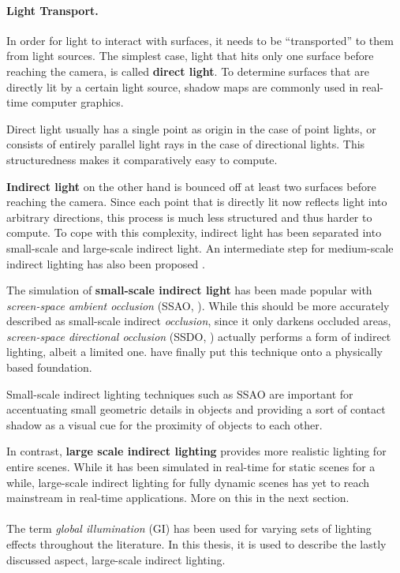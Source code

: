 \paragraph{Light Transport.}

In order for light to interact with surfaces, it needs to be ``transported'' to them from light sources. The simplest case, light that hits only one surface before reaching the camera, is called \textbf{direct light}. To determine surfaces that are directly lit by a certain light source, shadow maps are commonly used in real-time computer graphics.

Direct light usually has a single point as origin in the case of point lights, or consists of entirely parallel light rays in the case of directional lights. This structuredness makes it comparatively easy to compute.

\textbf{Indirect light} on the other hand is bounced off at least two surfaces before reaching the camera. Since each point that is directly lit now reflects light into arbitrary directions, this process is much less structured and thus harder to compute. To cope with this complexity, indirect light has been separated into small-scale and large-scale indirect light. An intermediate step for medium-scale indirect lighting has also been proposed \citep{reed:2012:mediumAO}.

The simulation of \textbf{small-scale indirect light} has been made popular with \textit{screen-space ambient occlusion} (SSAO, \cite{Mittring:2007:Cryengine2}). While this should be more accurately described as small-scale indirect \textit{occlusion}, since it only darkens occluded areas, \textit{screen-space directional occlusion} (SSDO, \cite{Ritschel:2009:SSDO}) actually performs a form of indirect lighting, albeit a limited one. \citet{jimenez:2016:AO} have finally put this technique onto a physically based foundation.

Small-scale indirect lighting techniques such as SSAO are important for accentuating small geometric details in objects and providing a sort of contact shadow as a visual cue for the proximity of objects to each other.

In contrast, \textbf{large scale indirect lighting} provides more realistic lighting for entire scenes. While it has been simulated in real-time for static scenes for a while, large-scale indirect lighting for fully dynamic scenes has yet to reach mainstream in real-time applications. More on this in the next section.
\\
\\
The term \textit{global illumination} (GI) has been used for varying sets of lighting effects throughout the literature. In this thesis, it is used to describe the lastly discussed aspect, large-scale indirect lighting.



